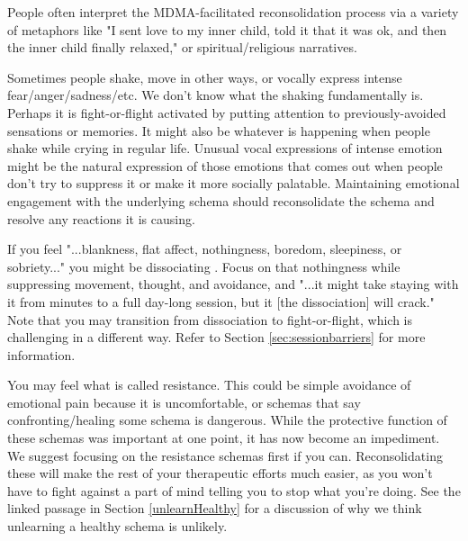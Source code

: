 \documentclass[12pt,letterpaper]{book}
\begin{document}
People often interpret the MDMA-facilitated reconsolidation process via a variety of metaphors like "I sent love to my inner child, told it that it was ok, and then the inner child finally relaxed," or spiritual/religious narratives.%

Sometimes people shake, move in other ways, or vocally express intense fear/anger/sadness/etc. We don't know what the shaking fundamentally is. Perhaps it is fight-or-flight activated by putting attention to previously-avoided sensations or memories. It might also be whatever is happening when people shake while crying in regular life. Unusual vocal expressions of intense emotion might be the natural expression of those emotions that comes out when people don't try to suppress it or make it more socially palatable. Maintaining emotional engagement with the underlying schema should reconsolidate the schema and resolve any reactions it is causing. 

If you feel "...blankness, flat affect, nothingness, boredom, sleepiness, or sobriety..." you might be dissociating \cite{razviPSIP}. Focus on that nothingness while suppressing movement, thought, and avoidance, and "...it might take staying with it from minutes to a full day-long session, but it [the dissociation] will crack." Note that you may transition from dissociation to fight-or-flight, which is challenging in a different way. Refer to Section \ref{sec:sessionbarriers} for more information.

You may feel what is called resistance. This could be simple avoidance of emotional pain because it is uncomfortable, or schemas that say confronting/healing some schema is dangerous. While the protective function of these schemas was important at one point, it has now become an impediment. We suggest focusing on the resistance schemas first if you can. Reconsolidating these will make the rest of your therapeutic efforts much easier, as you won't have to fight against a part of mind telling you to stop what you're doing. See the linked passage in Section \ref{unlearnHealthy} for a discussion of why we think unlearning a healthy schema is unlikely.
\end{document}
